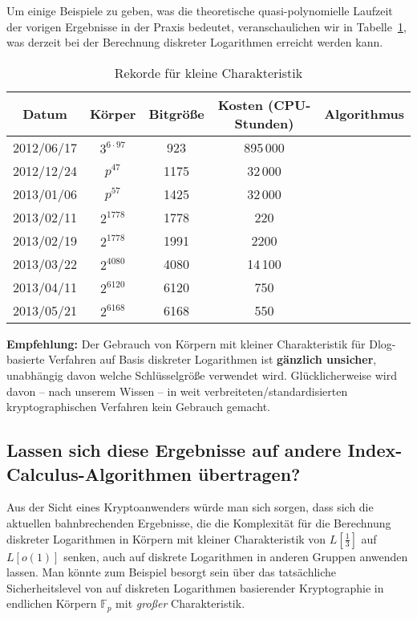 \begin{refsegment}
Um einige Beispiele zu geben, was die theoretische quasi-polynomielle Laufzeit der vorigen Ergebnisse in der Praxis bedeutet, veranschaulichen wir in Tabelle~\ref{dlog-table}, was derzeit bei der Berechnung diskreter Logarithmen erreicht werden kann.

\begin{table}[h]
\begin{center}
\begin{tabular}{ccccc}
Datum & Körper & Bitgröße & Kosten (CPU-Stunden) & Algorithmus\\
\hline
 2012/06/17&$3^{6\cdot 97}$ & 923 & 895\,000 & \cite{JL2006}\\
2012/12/24&$p^{47}$ & 1175 & 32\,000 & \cite{Pin2013}\\
2013/01/06&$p^{57}$ & 1425 & 32\,000 & \cite{Pin2013}\\
2013/02/11 &$2^{1778}$ & 1778 & 220 & \cite{Joux2013}\\
2013/02/19 &$2^{1778}$ & 1991 & 2200 & \cite{GGMZ2013}\\
2013/03/22 &$2^{4080}$& 4080 & 14\,100 & \cite{Joux2013}\\
2013/04/11&$2^{6120}$ & 6120 & 750 & \cite{Joux2013}\\
2013/05/21&$2^{6168}$ & 6168 & 550 & \cite{Joux2013}\\
\hline
\end{tabular}
\caption{Rekorde für kleine Charakteristik}
\label{dlog-table}
\end{center}
\end{table}

\noindent \textbf{Empfehlung:}
Der Gebrauch von Körpern mit kleiner Charakteristik für Dlog-basierte Verfahren auf Basis diskreter Logarithmen ist \textbf{gänzlich unsicher}, unabhängig davon welche Schlüsselgröße verwendet wird. Glücklicherweise wird davon -- nach unserem Wissen -- in weit verbreiteten/standardisierten kryptographischen Verfahren kein Gebrauch gemacht.



\subsection{Lassen sich diese Ergebnisse auf andere
Index-Calculus-Algo\-rithmen übertragen?}

Aus der Sicht eines Kryptoanwenders würde man sich sorgen, dass sich die aktuellen bahnbrechenden Ergebnisse, die die Komplexität für die Berechnung diskreter Logarithmen in Körpern mit kleiner Charakteristik von $L[\frac 1 3]$ auf $L[o(1)]$ senken, auch auf diskrete Logarithmen in anderen Gruppen anwenden lassen. Man könnte zum Beispiel besorgt sein über das tatsächliche Sicherheitslevel von auf diskreten Logarithmen basierender Kryptographie in endlichen Körpern $\mathbb{F}_p$ mit {\em großer} Charakteristik.\\[0.1cm]


\end{refsegment}
